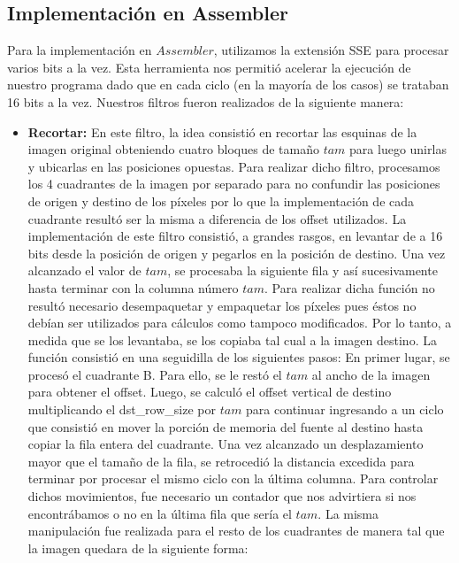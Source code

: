 \documentclass[10pt, a4paper]{article}
\begin{document}
\subsection{Implementación en Assembler}
Para la implementación en $Assembler$, utilizamos la extensión SSE para procesar varios bits a la vez. Esta herramienta nos permitió acelerar la ejecución de nuestro programa dado que en cada ciclo (en la mayoría de los casos) se trataban 16 bits a la vez.\newline
Nuestros filtros fueron realizados de la siguiente manera:
\begin{itemize}
\item {\textbf{Recortar:}}
En este filtro, la idea consistió en recortar las esquinas de la imagen original obteniendo cuatro bloques de tamaño $tam$ para luego unirlas y ubicarlas en las posiciones opuestas.\newline
Para realizar dicho filtro, procesamos los 4 cuadrantes de la imagen por separado para no confundir las posiciones de origen y destino de los píxeles por lo que la implementación de cada cuadrante resultó ser la misma a diferencia de los offset utilizados.\newline
La implementación de este filtro consistió, a grandes rasgos, en levantar de a 16 bits desde la posición de origen y pegarlos en la posición de destino. Una vez alcanzado el valor de $tam$, se procesaba la siguiente fila y así sucesivamente hasta terminar con la columna número $tam$.	\newline
Para realizar dicha función no resultó necesario desempaquetar y empaquetar los píxeles pues éstos no debían ser utilizados para cálculos como tampoco modificados. Por lo tanto, a medida que se los levantaba, se los copiaba tal cual a la imagen destino.\newline
\newline
La función consistió en una seguidilla de los siguientes pasos:\newline
En primer lugar, se procesó el cuadrante B. Para ello, se le restó el $tam$ al ancho de la imagen para obtener el offset. Luego, se calculó el offset vertical de destino multiplicando el dst\_row\_size por $tam$ para continuar ingresando a un ciclo que consistió en mover la porción de memoria del fuente al destino hasta copiar la fila entera del cuadrante. Una vez alcanzado un desplazamiento mayor que el tamaño de la fila, se retrocedió la distancia excedida para terminar por procesar el mismo ciclo con la última columna. Para controlar dichos movimientos, fue necesario un contador que nos advirtiera si nos encontrábamos o no en la última fila que sería el $tam$.\newline
La misma manipulación fue realizada para el resto de los cuadrantes de manera tal que la imagen quedara de la siguiente forma:\newline


\end{itemize}
\end{document}
